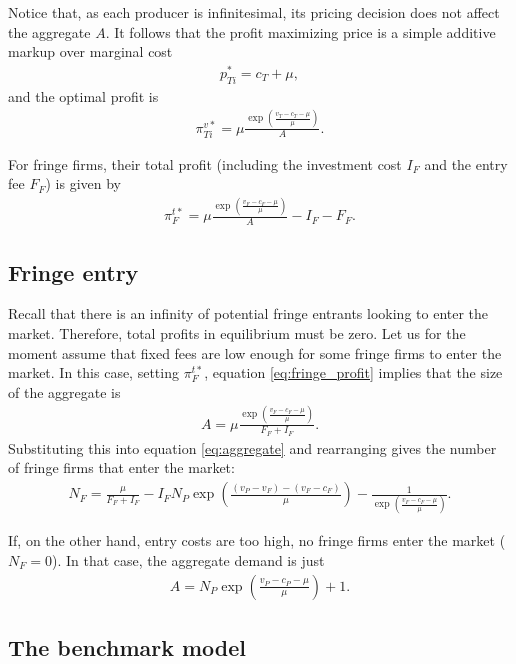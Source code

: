 \documentclass[a4paper]{article}
\begin{document}
Notice that, as each producer is infinitesimal, its pricing decision does not affect the aggregate $A$.
It follows that the profit maximizing price is a simple additive markup over marginal cost
\begin{align*}
    p^*_{Ti} = c_T + \mu,
\end{align*}
and the optimal profit is
\begin{align}
    \pi^{v*}_{Ti} = \mu \frac{\exp \left( \frac{v_T - c_T - \mu}{\mu} \right)}{A}.
    \label{eq:optimal_profit}
\end{align}

For fringe firms, their total profit (including the investment cost $I_F$ and the entry fee $F_F$) is given by
\begin{align}
    \pi^{t*}_F = \mu \frac{\exp \left( \frac{v_F - c_F - \mu}{\mu} \right)}{A} - I_F - F_F.
    \label{eq:fringe_profit}
\end{align}

\subsection{Fringe entry}

Recall that there is an infinity of potential fringe entrants looking to enter the market.
Therefore, total profits in equilibrium must be zero.
Let us for the moment assume that fixed fees are low enough for some fringe firms to enter the market.
In this case, setting $\pi^{t*}_F$, equation \eqref{eq:fringe_profit} implies that the size of the aggregate is
\begin{align}
    A = \mu \frac{\exp \left( \frac{v_F - c_F - \mu}{\mu} \right)}{F_F + I_F}.
    \label{eq:aggregate_eq}
\end{align}
Substituting this into equation \eqref{eq:aggregate} and rearranging gives the number of fringe firms that enter the market:
\begin{align*}
    N_F = \frac{\mu}{F_F + I_F} - I_F N_P \exp \left( \frac{(v_P - v_F) - (v_F - c_F)}{\mu} \right) - \frac{1}{\exp \left( \frac{v_F - c_F - \mu}{\mu} \right)}.
\end{align*}

If, on the other hand, entry costs are too high, no fringe firms enter the market ($N_F = 0$).
In that case, the aggregate demand is just
\begin{align*}
    A = N_P \exp\left( \frac{v_P - c_P - \mu}{\mu} \right) + 1.
\end{align*}

\subsection{The benchmark model}
\end{document}
